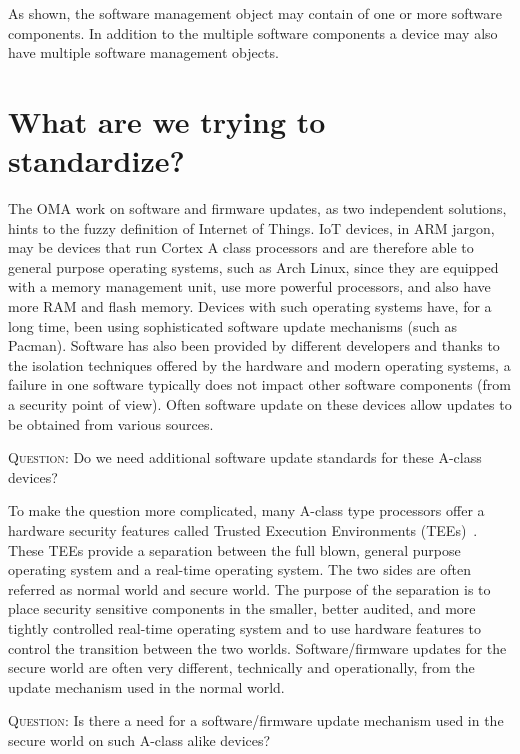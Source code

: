 \documentclass[peerreview, a4paper, 7pt]{IEEEtran}
\begin{document}
As shown, the software management object may contain of one or more software components. In addition to the multiple software components a device may also have multiple software management objects. 

\section{What are we trying to standardize?}
\label{what}

The OMA work on software and firmware updates, as two independent solutions, hints to the fuzzy definition of Internet of Things. IoT devices, in ARM jargon, may be devices that run Cortex A class processors and are therefore able to general purpose operating systems, such as Arch Linux, since they are equipped with a memory management unit, use more powerful processors, and also have more RAM and flash memory. Devices with such operating systems have, for a long time, been using sophisticated software update mechanisms (such as Pacman). Software has also been provided by different developers and thanks to the isolation techniques offered by the hardware and modern operating systems, a failure in one software typically does not impact other software components (from a security point of view). Often software update on these devices allow updates to be obtained from various sources. 

\textsc{Question}: Do we need additional software update standards for these A-class devices?

To make the question more complicated, many A-class type processors offer a hardware security features called Trusted Execution Environments (TEEs)~\cite{TEE}. These TEEs provide a separation between the full blown, general purpose operating system and a real-time operating system. The two sides are often referred as normal world and secure world. The purpose of the separation is to place security sensitive components in the smaller, better audited, and more tightly controlled real-time operating system and to use hardware features to control the transition between the two worlds. Software/firmware updates for the secure world are often very different, technically and operationally, from the update mechanism used in the normal world.

\textsc{Question}: Is there a need for a software/firmware update mechanism used in the secure world on such A-class alike devices? 
\end{document}
